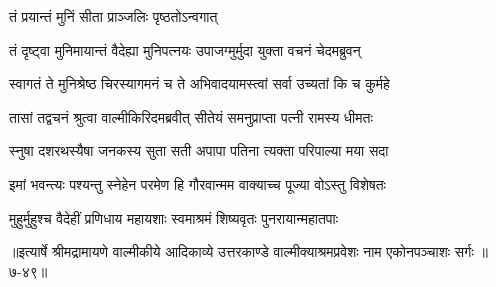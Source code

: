 \onelineshloka
{तं प्रयान्तं मुनिं सीता प्राञ्जलिः पृष्ठतोऽन्वगात्} %

\twolineshloka
{तं दृष्ट्वा मुनिमायान्तं वैदेह्या मुनिपत्नयः}
{उपाजग्मुर्मुदा युक्ता वचनं चेदमब्रुवन्} %

\twolineshloka
{स्वागतं ते मुनिश्रेष्ठ चिरस्यागमनं च ते}
{अभिवादयामस्त्वां सर्वा उच्यतां कि च कुर्महे} %

\twolineshloka
{तासां तद्वचनं श्रुत्वा वाल्मीकिरिदमब्रवीत्}
{सीतेयं समनुप्राप्ता पत्नी रामस्य धीमतः} %

\twolineshloka
{स्नुषा दशरथस्यैषा जनकस्य सुता सती}
{अपापा पतिना त्यक्ता परिपाल्या मया सदा} %

\twolineshloka
{इमां भवन्त्यः पश्यन्तु स्नेहेन परमेण हि}
{गौरवान्मम वाक्याच्च पूज्या वोऽस्तु विशेषतः} %

\twolineshloka
{मुहुर्मुहुश्च वैदेहीं प्रणिधाय महायशाः}
{स्वमाश्रमं शिष्यवृतः पुनरायान्महातपाः} %


॥इत्यार्षे श्रीमद्रामायणे वाल्मीकीये आदिकाव्ये उत्तरकाण्डे वाल्मीक्याश्रमप्रवेशः नाम एकोनपञ्चाशः सर्गः ॥७-४९॥
